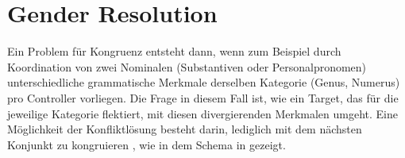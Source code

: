 \section{Gender Resolution}
\label{sec:gendres}

Ein Problem für Kongruenz entsteht dann, wenn zum Beispiel durch Koordination
von zwei Nominalen (Substantiven oder Personalpronomen) unterschiedliche
grammatische Merkmale derselben Kategorie (Genus, Numerus) pro Controller
vorliegen. Die Frage in diesem Fall ist, wie ein Target, das für die jeweilige
Kategorie flektiert, mit diesen divergierenden Merkmalen umgeht. Eine
Möglichkeit der Konfliktlösung besteht darin, lediglich mit dem nächsten
Konjunkt zu kongruieren \autocites[;
vgl.][179--180]{corbett1983}[168--170]{corbett2006}, wie in dem Schema in
 gezeigt.

